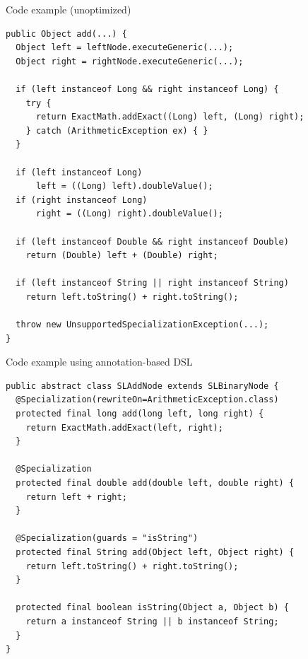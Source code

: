 \documentclass[xcolor=dvipsname]{beamer}
\begin{document}
\begin{frame}[fragile]{Code example (unoptimized)}
\begin{lstlisting}
public Object add(...) {
  Object left = leftNode.executeGeneric(...);
  Object right = rightNode.executeGeneric(...);

  if (left instanceof Long && right instanceof Long) {
    try {
      return ExactMath.addExact((Long) left, (Long) right);
    } catch (ArithmeticException ex) { }
  }

  if (left instanceof Long)
      left = ((Long) left).doubleValue();
  if (right instanceof Long)
      right = ((Long) right).doubleValue();

  if (left instanceof Double && right instanceof Double)
    return (Double) left + (Double) right;

  if (left instanceof String || right instanceof String)
    return left.toString() + right.toString();

  throw new UnsupportedSpecializationException(...);
}
\end{lstlisting}
\end{frame}

\begin{frame}[fragile]{Code example using annotation-based DSL}
  \begin{lstlisting}
public abstract class SLAddNode extends SLBinaryNode {
  @Specialization(rewriteOn=ArithmeticException.class)
  protected final long add(long left, long right) {
    return ExactMath.addExact(left, right);
  }

  @Specialization
  protected final double add(double left, double right) {
    return left + right;
  }

  @Specialization(guards = "isString")
  protected final String add(Object left, Object right) {
    return left.toString() + right.toString();
  }

  protected final boolean isString(Object a, Object b) {
    return a instanceof String || b instanceof String;
  }
}
  \end{lstlisting}
\end{frame}
\end{document}
